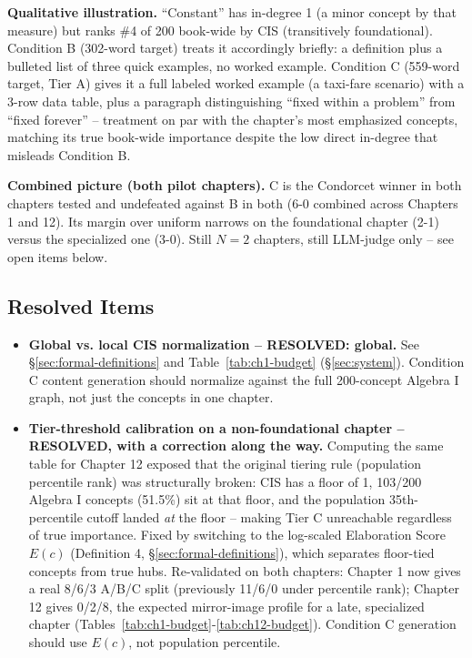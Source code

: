 \textbf{Qualitative illustration.} ``Constant'' has in-degree 1 (a minor
concept by that measure) but ranks \#4 of 200 book-wide by CIS (transitively
foundational). Condition B (302-word target) treats it accordingly briefly:
a definition plus a bulleted list of three quick examples, no worked
example. Condition C (559-word target, Tier A) gives it a full labeled
worked example (a taxi-fare scenario) with a 3-row data table, plus a
paragraph distinguishing ``fixed within a problem'' from ``fixed forever'' --
treatment on par with the chapter's most emphasized concepts, matching its
true book-wide importance despite the low direct in-degree that misleads
Condition B.

\textbf{Combined picture (both pilot chapters).} C is the Condorcet winner
in both chapters tested and undefeated against B in both (6-0 combined
across Chapters 1 and 12). Its margin over uniform narrows on the
foundational chapter (2-1) versus the specialized one (3-0). Still $N=2$
chapters, still LLM-judge only -- see open items below.

\subsection{Resolved Items}
\begin{itemize}
    \item \textbf{Global vs. local CIS normalization -- RESOLVED: global.} See
          \S\ref{sec:formal-definitions} and Table~\ref{tab:ch1-budget}
          (\S\ref{sec:system}). Condition C content generation should
          normalize against the full 200-concept Algebra I graph, not just
          the concepts in one chapter.
    \item \textbf{Tier-threshold calibration on a non-foundational chapter --
          RESOLVED, with a correction along the way.} Computing the same
          table for Chapter 12 exposed that the original tiering rule
          (population percentile rank) was structurally broken: CIS has a
          floor of 1, 103/200 Algebra I concepts (51.5\%) sit at that floor,
          and the population 35th-percentile cutoff landed \emph{at} the
          floor -- making Tier C unreachable regardless of true importance.
          Fixed by switching to the log-scaled Elaboration Score $E(c)$
          (Definition 4, \S\ref{sec:formal-definitions}), which separates
          floor-tied concepts from true hubs. Re-validated on both chapters:
          Chapter 1 now gives a real 8/6/3 A/B/C split (previously 11/6/0
          under percentile rank); Chapter 12 gives 0/2/8, the expected
          mirror-image profile for a late, specialized chapter
          (Tables~\ref{tab:ch1-budget}-\ref{tab:ch12-budget}). Condition C
          generation should use $E(c)$, not population percentile.
\end{itemize}

